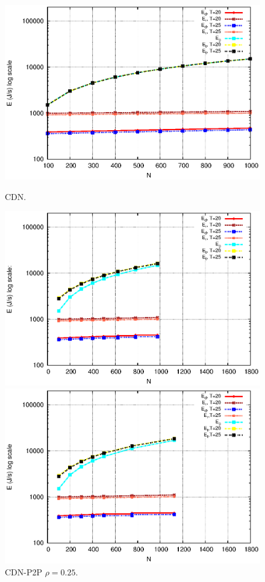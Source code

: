\documentclass[conference]{IEEEtran}
\begin{document}
\begin{figure}[ht]
\centering
\begin{minipage}[b]{0.3\linewidth}
	\includegraphics[scale=0.5]{graphs/cdn.eps}
	\caption{CDN.}
	\label{fig:4-0}
\end{minipage}
\hfill
\begin{minipage}[b]{0.3\linewidth}
	\includegraphics[scale=0.5]{graphs/cdnp2p-1.eps}
	\caption{CDN-P2P $\rho=0.25$.}
	\label{fig:4-1}
\end{minipage}
\hfill
\begin{minipage}[b]{0.3\linewidth}
	\includegraphics[scale=0.5]{graphs/cdnp2p-2.eps}

\end{minipage}
\end{figure}
\end{document}
